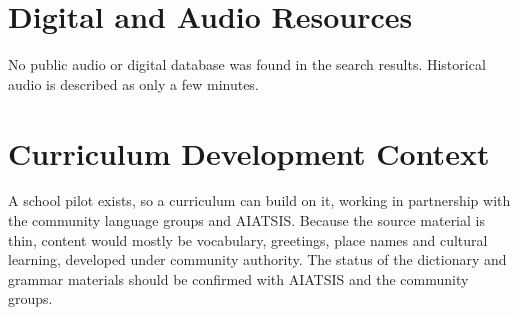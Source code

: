 \documentclass[12pt]{article}
\begin{document}
\section{Digital and Audio Resources}
No public audio or digital database was found in the search results. Historical audio is described as only a few minutes.
\section{Curriculum Development Context}
A school pilot exists, so a curriculum can build on it, working in partnership with the community language groups and AIATSIS. Because the source material is thin, content would mostly be vocabulary, greetings, place names and cultural learning, developed under community authority. The status of the dictionary and grammar materials should be confirmed with AIATSIS and the community groups.
\end{document}

